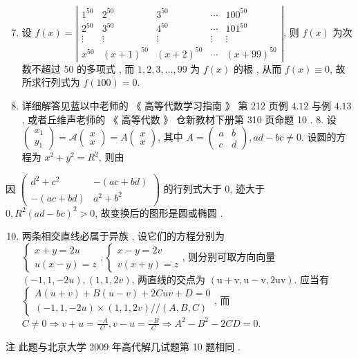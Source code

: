 \documentclass[10pt]{article}
\begin{document}
\begin{enumerate}
  \setcounter{enumi}{6}
  \item  设  $f(x)=\left|\begin{array}{ccccc}1^{50} & 2^{50} & 3^{50} & \cdots & 100^{50} \\ 2^{50} & 3^{50} & 4^{50} & \cdots & 101^{50} \\ \vdots & \vdots & \vdots & \vdots & \vdots \\ x^{50} & (x+1)^{50} & (x+2)^{50} & \cdots & (x+99)^{50}\end{array}\right|$,  则  $f(x)$  为次数不超过  50  的多项式 ,  而  $1,2,3, \ldots, 99$  为  $f(x)$  的根 ,  从而  $f(x) \equiv 0$,  故所求行列式为  $f(100)=0$.

  \item  详细解答见蓝以中老师的 《 高等代数学习指南 》 第  212  页例  $4.12$  与例  $4.13$,  或者丘维声老师的 《 高等代数 》  仓新教材下册第  310  页命题  10 . 8.  设  $\left(\begin{array}{l}x_{1} \\ y_{1}\end{array}\right)=\mathscr{A}\left(\begin{array}{l}x \\ x\end{array}\right)=A\left(\begin{array}{l}x \\ x\end{array}\right)$,  其中  $A=\left(\begin{array}{ll}a & b \\ c & d\end{array}\right), a d-b c \neq 0$.  设圆的方程为  $x^{2}+y^{2}=R^{2}$,  则由 

\end{enumerate}
 因  $\left(\begin{array}{cc}d^{2}+c^{2} & -(a c+b d) \\ -(a c+b d) & a^{2}+b^{2}\end{array}\right)$  的行列式大于  0,  迹大于  $0, R^{2}(a d-b c)^{2}>0$,  故变换后的图形是圆或椭圆 .

\begin{enumerate}
  \setcounter{enumi}{9}
  \item  两条相交直线必属于异族 ,  设它们的方程分别为  $\left\{\begin{array}{c}x+y=2 u \\ u(x-y)=z\end{array},\left\{\begin{array}{c}x-y=2 v \\ v(x+y)=z\end{array}\right.\right.$,  则分别可取方向向量  $(-1,1,-2 u),(1,1,2 v)$,  两直线的交点为  $(\mathrm{u}+\mathrm{v}, \mathrm{u}-\mathrm{v}, 2 \mathrm{uv}) .$  应当有  $\left\{\begin{array}{c}A(u+v)+B(u-v)+2 C u v+D=0 \\ (-1,1,-2 u) \times(1,1,2 v) / /(A, B, C)\end{array}\right.$,  而  $C \neq 0 \Longrightarrow v+u=\frac{-A}{C}, v-u=\frac{-B}{C} \Longrightarrow A^{2}-B^{2}-2 C D=0$.
\end{enumerate}
 注   此题与北京大学  2009  年高代解几试题第  10  题相同 .
\end{document}
